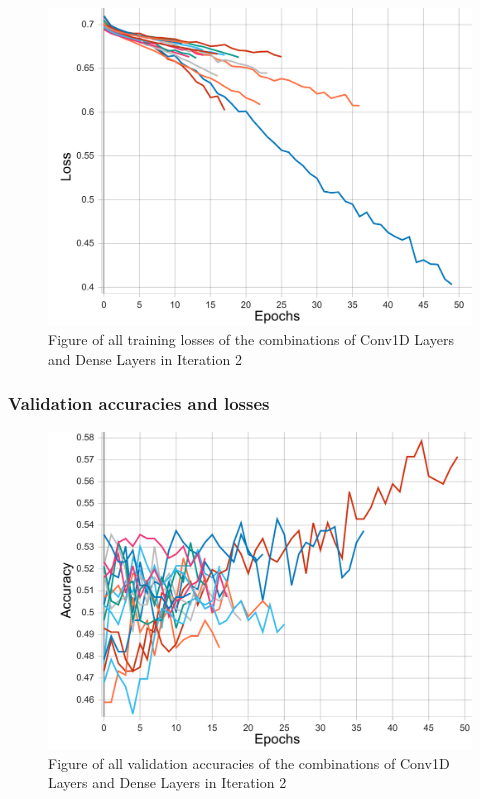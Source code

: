 \begin{figure}[ht]
    \centering
    \includegraphics[width=0.95\columnwidth]{figures/results/cnn/cnn_all_loss_t.pdf}
    \caption[Training losses for Iteration 2]{Figure of all training losses of the combinations of Conv1D Layers and Dense Layers in Iteration 2}
    \label{fig:iteration2_train_loss}
\end{figure}
\FloatBarrier

\subsubsection{Validation accuracies and losses}
\begin{figure}[ht]
    \centering
    \includegraphics[width=0.95\columnwidth]{figures/results/cnn/cnn_all_acc.pdf}
    \caption[Validation accuracies for Iteration 2]{Figure of all validation accuracies of the combinations of Conv1D Layers and Dense Layers in Iteration 2}
    \label{fig:iteration2_all_accuracy}
\end{figure}
\FloatBarrier

